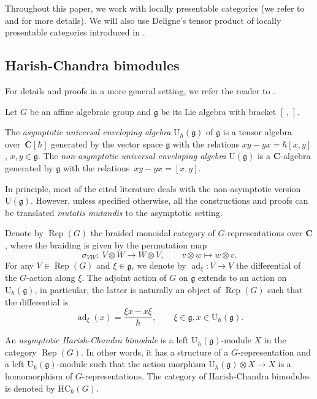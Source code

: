 \documentclass[pdftex]{sigma}
\numberwithin{equation}{section}
\newcommand{\C}{\mathbf{C}}
\newcommand{\U}{\mathrm{U}_{\hbar}}
\newcommand{\g}{\mathfrak{g}}
\DeclareMathOperator{\ad}{ad}
\newcommand{\HC}{\mathrm{HC}_{\hbar}}
\DeclareMathOperator{\Rep}{Rep}
\begin{document}
Throughout this paper, we work with locally presentable categories (we refer to \cite{AdamekRosicky} and \cite[Section 2]{BCJF} for more details). We will also use Deligne's tensor product of locally presentable categories introduced in \cite{Deligne}.
	
	
	\subsection{Harish-Chandra bimodules}
	\label{subsect::hc_bimod}
	For details and proofs in a more general setting, we refer the reader to \cite[Section 2]{KalmykovSafronov}.
	
	Let $G$ be an affine algebraic group and $\g$ be its Lie algebra with bracket $[\,,\,]$.
	
	\begin{Definition}
		\label{def::asympt_uea}
		The \emph{asymptotic universal enveloping algebra} $\U(\g)$ of $\g$ is a tensor algebra over~$\C[\hbar]$ generated by the vector space $\g$ with the relations
$
		xy - yx = \hbar [x,y]$, $ x,y\in \g$.
		The \emph{non-asymptotic universal enveloping algebra} $\mathrm{U}(\g)$ is a $\C$-algebra generated by $\g$ with the relations~${xy - yx = [x,y]}$.
	\end{Definition}
	
	\begin{Remark}
		In principle, most of the cited literature deals with the non-asymptotic version~$\mathrm{U}(\g)$. However, unless specified otherwise, all the constructions and proofs can be translated \emph{mutatis mutandis} to the asymptotic setting.
	\end{Remark}
	
	Denote by $\Rep(G)$ the braided monoidal category of $G$-representations over $\C$, where the braiding is given by the permutation map
	\[
	\sigma_{VW} \colon\ V \otimes W \rightarrow W \otimes V, \qquad v\otimes w \mapsto w \otimes v.
	\]
	For any $V \in \Rep(G)$ and $\xi\in \g$, we denote by $\ad_{\xi} \colon V \rightarrow V$ the differential of the $G$-action along $\xi$. The adjoint action of $G$ on $\g$ extends to an action on $\U(\g)$, in particular, the latter is naturally an object of $\Rep(G)$ such that the differential is
	\begin{equation*}
		\ad_{\xi}(x) = \frac{\xi x - x \xi}{\hbar},\qquad \xi\in \g, x\in \U(\g).
	\end{equation*}
	
	\begin{Definition}
		An \emph{asymptotic Harish-Chandra bimodule} is a left $\U(\g)$-module $X$ in the category $\Rep(G)$. In other words, it has a structure of a $G$-representation and a left $\U(\g)$-module such that the action morphism
		$
		\U(\g) \otimes X \rightarrow X
		$
		is a homomorphism of $G$-representations. The category of Harish-Chandra bimodules is denoted by $\HC(G)$.
	\end{Definition}
	
\end{document}
